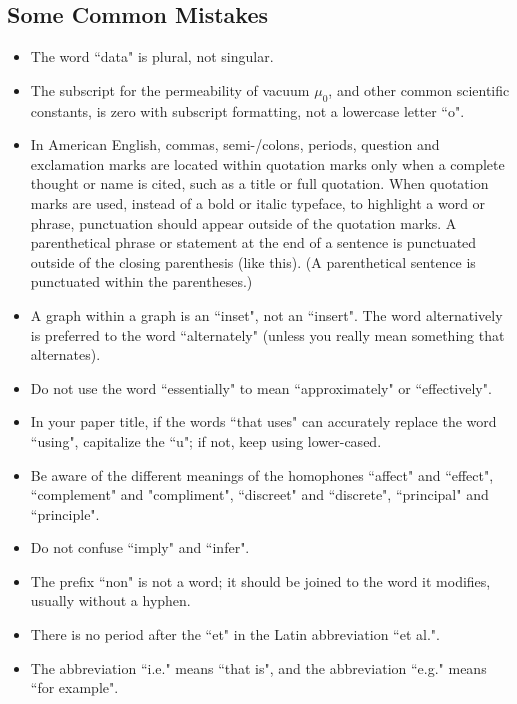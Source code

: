 \documentclass[conference]{IEEEtran}
\begin{document}
\subsection{Some Common Mistakes}
\begin{itemize}

    \item The word ``data" is plural, not singular.

    \item The subscript for the permeability of vacuum $\mu_0$, and other common scientific constants, is zero with subscript formatting, not a lowercase letter ``o".

    \item In American English, commas, semi-/colons, periods, question and exclamation marks are located within quotation marks only when a complete thought or name is cited, such as a title or full quotation. When quotation marks are used, instead of a bold or italic typeface, to highlight a word or phrase, punctuation should appear outside of the quotation marks. A parenthetical phrase or statement at the end of a sentence is punctuated outside of the closing parenthesis (like this). (A parenthetical sentence is punctuated within the parentheses.)

    \item A graph within a graph is an ``inset", not an ``insert". The word alternatively is preferred to the word ``alternately" (unless you really mean something that alternates).

    \item Do not use the word ``essentially" to mean ``approximately" or ``effectively".

    \item In your paper title, if the words ``that uses" can accurately replace the word ``using", capitalize the ``u"; if not, keep using lower-cased.

    \item Be aware of the different meanings of the homophones ``affect" and ``effect", ``complement" and "compliment", ``discreet" and ``discrete", ``principal" and ``principle".

    \item Do not confuse ``imply" and ``infer".

    \item The prefix ``non" is not a word; it should be joined to the word it modifies, usually without a hyphen.

    \item There is no period after the ``et" in the Latin abbreviation ``et al.".

    \item The abbreviation ``i.e." means ``that is", and the abbreviation ``e.g." means ``for example".

\end{itemize}
\end{document}
